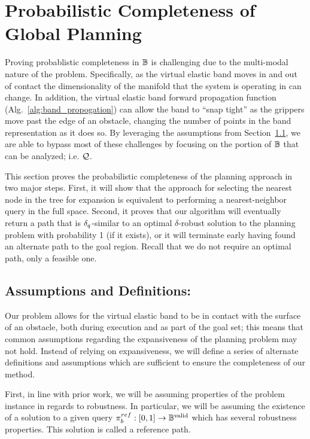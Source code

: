 \section{Probabilistic Completeness of Global Planning}
\label{sec:analysis}

Proving probablistic completeness in $\mathbb{B}$ is challenging due to the multi-modal nature of the problem. Specifically, as the virtual elastic band moves in and out of contact the dimensionality of the manifold that the system is operating in can change. In addition, the virtual elastic band forward propagation function (Alg.~\ref{alg:band_propogation}) can allow the band to ``snap tight'' as the grippers move past the edge of an obstacle, changing the number of points in the band representation as it does so. By leveraging the assumptions from Section~\ref{sec:rpath_assumptions}, we are able to bypass most of these challenges by focusing on the portion of $\mathbb{B}$ that can be analyzed; i.e. $\mathcal{Q}$.

This section proves the probabilistic completeness of the planning approach in two major steps.  First, it will show that the approach for selecting the nearest node in the tree for expansion is equivalent to performing a nearest-neighbor query in the full space.  Second, it proves that our algorithm will eventually return a path that is $\delta_q$-similar to an optimal $\delta$-robust solution to the planning problem with probability 1 (if it exists), or it will terminate early having found an alternate path to the goal region. Recall that we do not require an optimal path, only a feasible one.

\subsection{Assumptions and Definitions:}
\label{sec:rpath_assumptions}
Our problem allows for the virtual elastic band to be in contact with the surface of an obstacle, both during execution and as part of the goal set; this means that common assumptions regarding the expansiveness \cite{Hsu1999} of the planning problem may not hold. Instead of relying on expansiveness, we will define a series of alternate definitions and assumptions which are sufficient to ensure the completeness of our method.

First, in line with prior work, we will be assuming properties of the problem instance in regards to robustness.  In particular, we will be assuming the existence of a solution to a given query $\pi_{b}^{ref} : [0, 1] \rightarrow \mathbb{B}^\textrm{valid}$ which has several robustness properties.  This solution is called a reference path.


